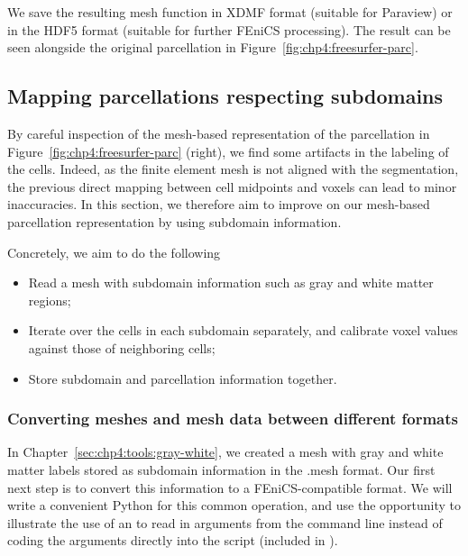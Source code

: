 We save the resulting mesh function in XDMF format (suitable for
Paraview) or in the HDF5 format (suitable for further FEniCS processing). 
The result can be seen alongside the original parcellation in
Figure~\ref{fig:chp4:freesurfer-parc}.


\subsection{Mapping parcellations respecting subdomains}
\label{chp4:parcellations}

By careful inspection of the mesh-based representation of the
parcellation in Figure~\ref{fig:chp4:freesurfer-parc} (right), we find
some artifacts in the labeling of the cells. Indeed, as the finite
element mesh is not aligned with the segmentation, the previous direct
mapping between cell midpoints and voxels can lead to minor
inaccuracies. In this section, we therefore aim to improve on our mesh-based
parcellation representation by using subdomain
information. 


Concretely, we aim to do the following
\begin{itemize}
\item
  Read a mesh with subdomain information such as gray and white matter
  regions;
\item
  Iterate over the cells in each subdomain separately, and calibrate
  voxel values against those of neighboring cells;
\item
  Store subdomain and parcellation information together.
\end{itemize}

\subsubsection*{Converting meshes and mesh data between different formats} 
\label{chp4:meshio-converting}

In Chapter~\ref{sec:chp4:tools:gray-white}, we created a mesh with
gray and white matter labels stored as subdomain information in the
.mesh format. Our first next step is to convert this information to a
FEniCS-compatible format. We will write a convenient Python for this
common operation, and use the opportunity to illustrate the use of an
 to read in arguments from the command
line instead of coding the arguments directly into the script
(included in ).

